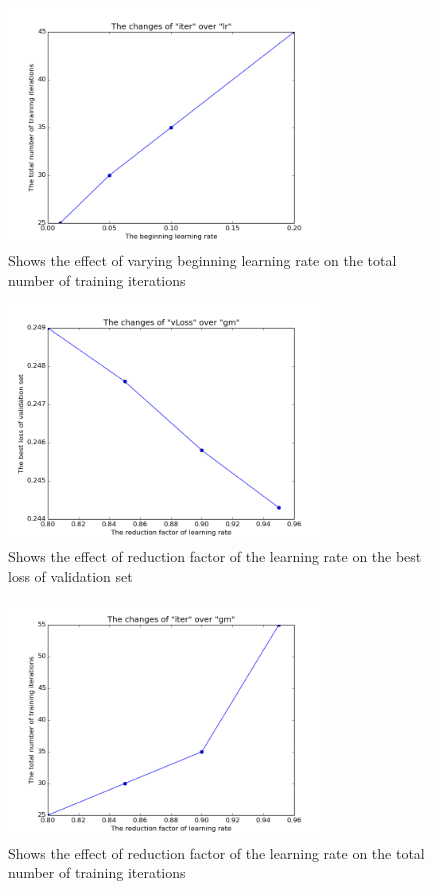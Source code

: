 \begin{figure}[H]
\centering
        \includegraphics[width=0.75\textwidth]{lriter} 
		\caption{Shows the effect of varying beginning learning rate on the total number of training iterations}
		\label{fig:lriter}
\end{figure}

\begin{figure}[H]
\centering 
        \includegraphics[width=0.75\textwidth]{gmloss} 	
        \caption{Shows the effect of reduction factor of the learning rate on the best loss of validation set}
        \label{fig:gmloss}
\end{figure}

\begin{figure}[H]
\centering 
        \includegraphics[width=0.75\textwidth]{gmiter} 
		\caption{Shows the effect of reduction factor of the learning rate on the total number of training iterations}
		\label{fig:gmiter}
\end{figure}

